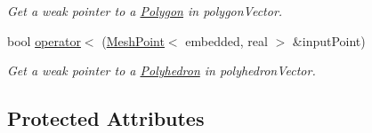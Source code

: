 \begin{DoxyCompactItemize}
\begin{DoxyCompactList}\small\item\em Get a weak pointer to a \hyperlink{class_polygon}{Polygon} in polygon\+Vector. \end{DoxyCompactList}\item 
bool \hyperlink{class_mesh_point_a429995d48aa19e82d8beccf3068a8851}{operator$<$} (\hyperlink{class_mesh_point}{Mesh\+Point}$<$ embedded, real $>$ \&input\+Point)
\begin{DoxyCompactList}\small\item\em Get a weak pointer to a \hyperlink{class_polyhedron}{Polyhedron} in polyhedron\+Vector. \end{DoxyCompactList}\end{DoxyCompactItemize}
\subsection*{Protected Attributes}
